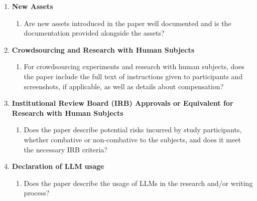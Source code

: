 \begin{enumerate}
\item {\bf New Assets}
    \begin{enumerate}
        \item Are new assets introduced in the paper well documented and
              is the documentation provided alongside the assets?
    \end{enumerate}

\item {\bf Crowdsourcing and Research with Human Subjects}
    \begin{enumerate}
        \item For crowdsourcing experiments and research with human
              subjects, does the paper include the full text of instructions
              given to participants and screenshots, if applicable, as well
              as details about compensation?
    \end{enumerate}

\item {\bf Institutional Review Board (IRB) Approvals or Equivalent for
         Research with Human Subjects}
    \begin{enumerate}
        \item Does the paper describe potential risks incurred by study
              participants, whether combative or non-combative to the
              subjects, and does it meet the necessary IRB criteria?
    \end{enumerate}

\item {\bf Declaration of LLM usage}
    \begin{enumerate}
        \item Does the paper describe the usage of LLMs in the research
              and/or writing process?
    \end{enumerate}

\end{enumerate}
